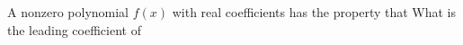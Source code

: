 A nonzero polynomial $f(x)$ with real coefficients has the property that   What is the leading coefficient of 